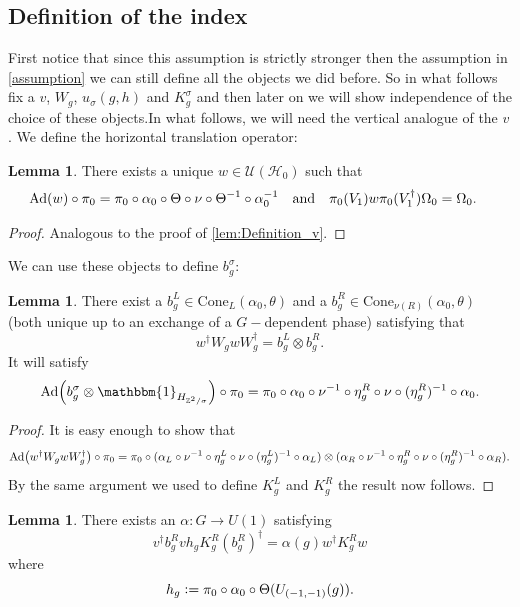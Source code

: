 \documentclass[12pt,a4paper,twoside]{article}
\newcommand{\defeq}{\vcentcolon=}
\let\originalleft\left
\let\originalright\right
\renewcommand{\left}{\mathopen{}\mathclose\bgroup\originalleft}
\renewcommand{\right}{\aftergroup\egroup\originalright}
\newcommand{\UU}{\mathcal U}
\newcommand{\HH}{\mathcal H}
\newcommand{\ZZ}{\mathbb Z}
\newcommand{\id}{\mathbbm{1}}
\newcommand{\Ad}[1]{\textrm{Ad}\left(#1\right)}
\theoremstyle{definition}
\newtheorem{lemma}[theorem]{Lemma}
\numberwithin{equation}{section}
\begin{document}
\subsection{Definition of the index}
 First notice that since this assumption is strictly stronger then the assumption in \ref{assumption} we can still define all the objects we did before. So in what follows fix a $v$, $W_g$, $u_\sigma(g,h)$ and $K_g^\sigma$ and then later on we will show independence of the choice of these objects.In what follows, we will need the vertical analogue of the $v$. We define the horizontal translation operator:
\begin{lemma}\label{lem:Definition_w}
	There exists a unique $w\in\UU(\HH_0)$ such that
	\begin{align}
		\Ad{w}\circ\pi_0&=\pi_0\circ\alpha_0\circ\Theta\circ\nu\circ\Theta^{-1}\circ\alpha_0^{-1}&&\text{and}&\pi_0(V_1)w\pi_0(V_1^\dagger)\Omega_0&=\Omega_0.
	\end{align}
\end{lemma}
\begin{proof}
	Analogous to the proof of \ref{lem:Definition_v}.
\end{proof}
 We can use these objects to define $b^\sigma_g$:
\begin{lemma}
	There exist a $b_g^L\in\textrm{Cone}_L(\alpha_0,\theta)$ and a $b_g^R\in\textrm{Cone}_{\nu(R)}(\alpha_0,\theta)$ (both unique up to an exchange of a $G-$dependent phase) satisfying that
	\begin{equation}
		w^\dagger W_g w W_g^\dagger=b_g^L\otimes b_g^R.
	\end{equation}
	It will satisfy
	\begin{equation}\label{eq:automorphismBelongingTo_b}
		\Ad{b_g^\sigma\otimes\id_{H_{\ZZ^2/\sigma}}}\circ\pi_0=\pi_0\circ\alpha_0\circ\nu^{-1}\circ\eta_g^R\circ\nu\circ(\eta_g^R)^{-1}\circ\alpha_0.
	\end{equation}
\end{lemma}
\begin{proof}
	It is easy enough to show that
	\begin{equation}
		\Ad{w^\dagger W_g w W_g^\dagger}\circ\pi_0=\pi_0\circ (\alpha_L\circ\nu^{-1}\circ\eta_g^L\circ\nu\circ(\eta_g^L)^{-1}\circ\alpha_L)\otimes(\alpha_R\circ\nu^{-1}\circ\eta_g^R\circ\nu\circ(\eta_g^R)^{-1}\circ\alpha_R).
	\end{equation}
	By the same argument we used to define $K_g^L$ and $K_g^R$ the result now follows.
\end{proof}
\begin{lemma}\label{lem:DefinitionAlpha}
	There exists an $\alpha:G\rightarrow U(1)$ satisfying
	\begin{equation}\label{eq:DefinitionOfTheH_1Index}
		v^\dagger b_g^R vh_g K_g^R (b_g^R)^\dagger=\alpha(g)w^\dagger K_g^R w
	\end{equation}
	where
	\begin{equation}
		h_g\defeq\pi_0\circ\alpha_0\circ\Theta(U_{(-1,-1)}(g)).
	\end{equation}
\end{lemma}
\end{document}
